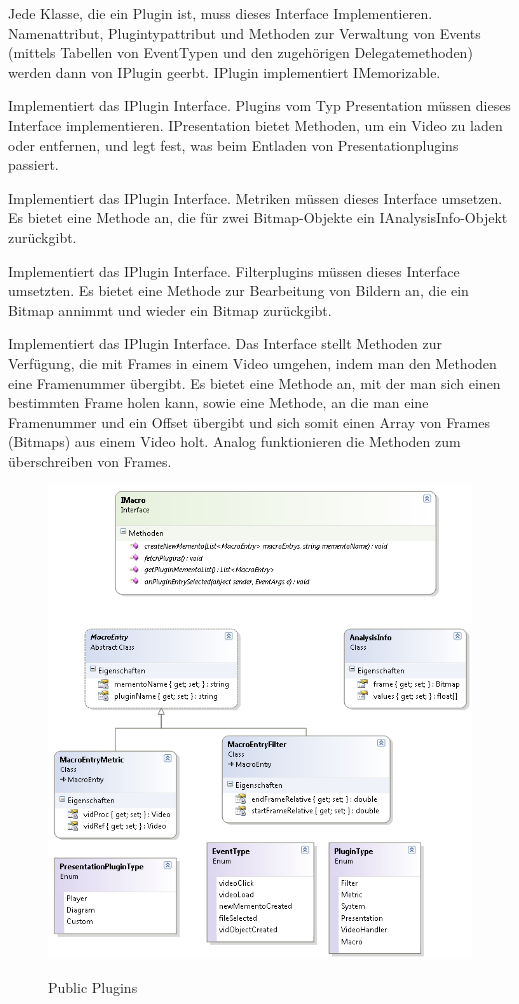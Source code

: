 Jede Klasse, die ein Plugin ist, muss dieses Interface Implementieren. Namenattribut, Plugintypattribut und Methoden zur Verwaltung von Events (mittels Tabellen von EventTypen und den zugehörigen Delegatemethoden) werden dann von IPlugin geerbt. IPlugin implementiert IMemorizable.


Implementiert das IPlugin Interface. Plugins vom Typ Presentation müssen dieses Interface implementieren. IPresentation bietet Methoden, um ein Video zu laden oder entfernen, und legt fest, was beim Entladen von Presentationplugins passiert.


Implementiert das IPlugin Interface. Metriken müssen dieses Interface umsetzen. Es bietet eine Methode an, die für zwei Bitmap-Objekte ein IAnalysisInfo-Objekt zurückgibt.


Implementiert das IPlugin Interface. Filterplugins müssen dieses Interface umsetzten. Es bietet eine Methode zur Bearbeitung von Bildern an, die ein Bitmap annimmt und wieder ein Bitmap zurückgibt.


Implementiert das IPlugin Interface. Das Interface stellt Methoden zur Verfügung, die mit Frames in einem Video umgehen, indem man den Methoden eine Framenummer übergibt. Es bietet eine Methode an, mit der man sich einen bestimmten Frame holen kann, sowie eine Methode, an die man eine Framenummer und ein Offset übergibt und sich somit einen Array von Frames (Bitmaps) aus einem Video holt. Analog funktionieren die Methoden zum überschreiben von Frames.

\begin{figure}[h]
\noindent\includegraphics[width=\linewidth,height=\textheight,
keepaspectratio]{bilder/Klassendiagramm/PluginInterfaces2.png}
\label{}
\caption{Public Plugins}
\end{figure}

